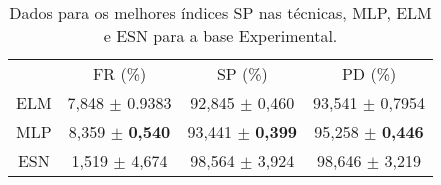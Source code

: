 \begin{table}[H]
	\centering
	\caption{Dados para os melhores índices SP nas técnicas, MLP, ELM e ESN para a base Experimental.}
	\label{tab:ROC_ELMxESNxMLP_exp}
		\begin{small}
	\setlength{\extrarowheight}{3pt}       %
	\begin{tabular}{*{4}{c}} \toprule
		&	     FR (\%)	 &	      SP (\%)     &       PD  (\%)     \\ \cmidrule(lr){2-2}\cmidrule(lr){3-3}\cmidrule(lr){4-4}
		ELM	& 7,848 $\pm$ 0.9383 &  92,845 $\pm$ 0,460 &   93,541 $\pm$ 0,7954 \\ \cmidrule(lr){1-1}\cmidrule(lr){2-2}\cmidrule(lr){3-3}\cmidrule(lr){4-4}
		MLP	& 8,359 $\pm$ \textbf{0,540} &  93,441 $\pm$ \textbf{0,399} &   95,258 $\pm$ \textbf{0,446}  \\ \cmidrule(lr){1-1}\cmidrule(lr){2-2}\cmidrule(lr){3-3}\cmidrule(lr){4-4}
		ESN	& 1,519 $\pm$ 4,674 &  98,564 $\pm$ 3,924 &   98,646 $\pm$ 3,219  \\ \bottomrule
	\end{tabular}%
		\end{small}
\end{table}%




